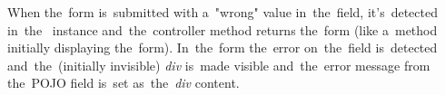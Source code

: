 \noindent When the~form is~submitted with a~"wrong" value in~the~field, it's~detected in~the~ instance and~the~controller method returns the~form (like a~method initially displaying the~form).
In~the~form the~error on~the~field is~detected and~the~(initially invisible) \textit{div} is~made visible and~the~error message from the~POJO field is~set as~the~\textit{div} content.

\todo

\todo
